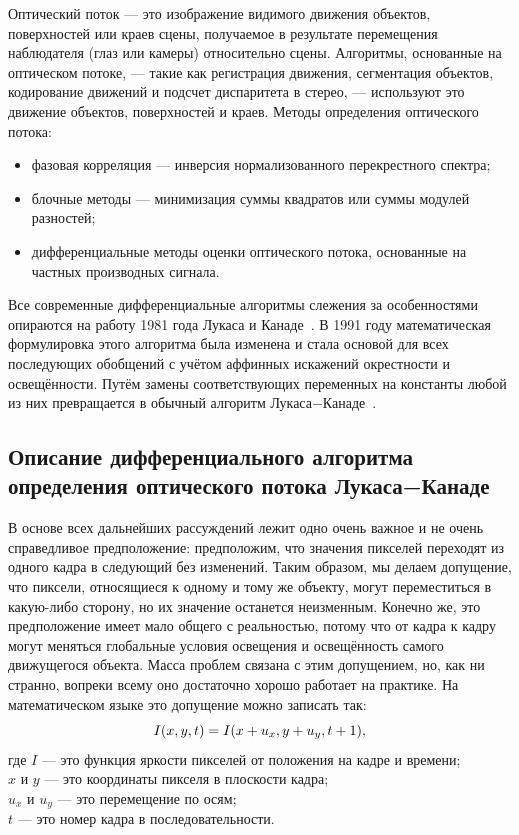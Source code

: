 Оптический поток — это изображение видимого движения объектов, поверхностей или краев сцены, получаемое в результате перемещения наблюдателя (глаз или камеры) относительно сцены. Алгоритмы, основанные на оптическом потоке, — такие как регистрация движения, сегментация объектов, кодирование движений и подсчет диспаритета в стерео, — используют это движение объектов, поверхностей и краев.
Методы определения оптического потока:
\begin{itemize}
\item фазовая корреляция — инверсия нормализованного перекрестного спектра;
\item блочные методы — минимизация суммы квадратов или суммы модулей разностей;
\item дифференциальные методы оценки оптического потока, основанные на частных производных сигнала.
\end{itemize}

Все современные дифференциальные алгоритмы слежения за особенностями опираются на работу 1981 года Лукаса и Канаде~\cite{Lucas1981}. В 1991 году математическая формулировка этого алгоритма была изменена и стала основой для всех последующих обобщений с учётом аффинных искажений окрестности и освещённости. Путём замены соответствующих переменных на константы любой из них превращается в обычный алгоритм Лукаса−Канаде~\cite{lk_jou}.
\subsection{Описание дифференциального алгоритма определения оптического потока Лукаса−Канаде}
\label{subsec:lycas_kanade_81}
В основе всех дальнейших рассуждений лежит одно очень важное и не очень справедливое предположение: предположим, что значения пикселей переходят из одного кадра в следующий без изменений. Таким образом, мы делаем допущение, что пиксели, относящиеся к одному и тому же объекту, могут переместиться в какую-либо сторону, но их значение останется неизменным. Конечно же, это предположение имеет мало общего с реальностью, потому что от кадра к кадру могут меняться глобальные условия освещения и освещённость самого движущегося объекта. Масса проблем связана с этим допущением, но, как ни странно, вопреки всему оно достаточно хорошо работает на практике. На математическом языке это допущение можно записать так:
\begin{equation}
\numberwithin{equation}{section}
\label{eq:f_1}
I(x,y,t)=I(x+u_x,y+u_y,t+1),
\end{equation}
где $I$ — это функция яркости пикселей от положения на кадре и времени;\\$x$ и $y$ — это координаты пикселя в плоскости кадра;\\
$u_x$ и $u_y$ — это перемещение по осям;\\
$t$ — это номер кадра в последовательности.

